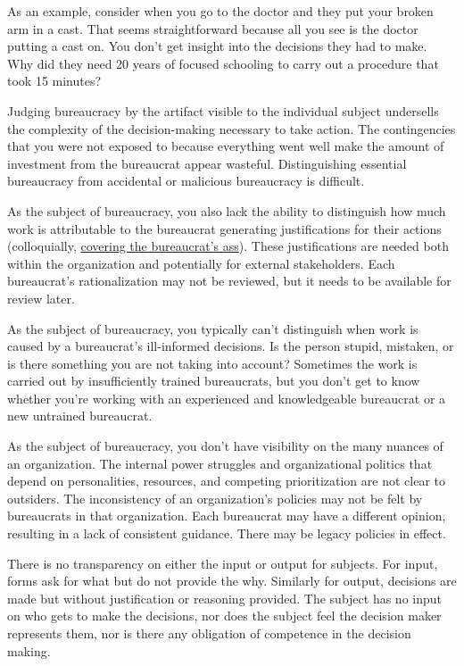 As an example, consider when you go to the doctor and they put your broken arm in a cast. That seems straightforward because all you see is the doctor putting a cast on. You don't get insight into the decisions they had to make. Why did they need 20 years of focused schooling to carry out a procedure that took 15 minutes?

Judging bureaucracy by the artifact visible to the individual subject undersells the complexity of the decision-making necessary to take action. The contingencies that you were not exposed to because everything went well make the amount of investment from the bureaucrat appear wasteful. Distinguishing essential bureaucracy from accidental or malicious bureaucracy is difficult.

As the subject of bureaucracy, you also lack the ability to distinguish how much work is attributable to the bureaucrat generating justifications for their actions (colloquially, \href{https://en.wikipedia.org/wiki/Cover_your_ass}{covering the bureaucrat's ass}). 
\iftoggle{WPinmargin}{\marginpar{$>$Wikipedia: Cover your ass}}{}
These justifications are needed both within the organization and potentially for external stakeholders. Each bureaucrat's rationalization may not be reviewed, but it needs to be available for review later.

As the subject of bureaucracy, you typically can't distinguish when work is caused by a bureaucrat's ill-informed decisions. Is the person stupid, mistaken, or is there something you are not taking into account?
Sometimes the work is carried out by insufficiently trained bureaucrats, but you don't get to know whether you're working with an experienced and knowledgeable bureaucrat or a new untrained bureaucrat. 

As the subject of bureaucracy, you don't have visibility on the many nuances of an organization. The internal power struggles and organizational politics that depend on personalities, resources, and competing prioritization are not clear to outsiders.
The inconsistency of an organization's policies may not be felt by bureaucrats in that organization. Each bureaucrat may have a different opinion, resulting in a lack of consistent guidance.
There may be legacy policies in effect.

There is no transparency on either the input or output for subjects. For input, forms ask for what but do not provide the why. Similarly for output, decisions are made but without justification or reasoning provided.
The subject has no input on who gets to make the decisions, nor does the subject feel the decision maker represents them, nor is there any obligation of competence in the decision making.

